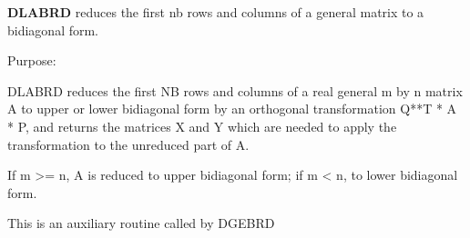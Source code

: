 {\bfseries D\+L\+A\+B\+R\+D} reduces the first nb rows and columns of a general matrix to a bidiagonal form. 

 \begin{DoxyParagraph}{Purpose\+: }
\begin{DoxyVerb} DLABRD reduces the first NB rows and columns of a real general
 m by n matrix A to upper or lower bidiagonal form by an orthogonal
 transformation Q**T * A * P, and returns the matrices X and Y which
 are needed to apply the transformation to the unreduced part of A.

 If m >= n, A is reduced to upper bidiagonal form; if m < n, to lower
 bidiagonal form.

 This is an auxiliary routine called by DGEBRD\end{DoxyVerb}
 
\end{DoxyParagraph}

